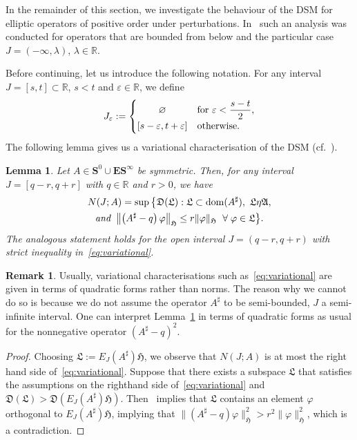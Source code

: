 \documentclass[10pt]{amsart}
\newtheorem{lemm}[theo]{Lemma}\newtheorem{prop}[theo]{Proposition}\newtheorem{coro}[theo]{Corollary}\newtheorem{conj}[theo]{Conjecture}
\theoremstyle{definition}\newtheorem{defi}[theo]{Definition}\newtheorem{rema}[theo]{Remark}\newtheorem{exam}[theo]{Example}\newtheorem{nota}[theo]{Notation}
\DeclareMathOperator{\dom}{dom}
\newcommand{\R}{\mathbb R}
\newcommand{\BE}{\mathbf E}
\newcommand{\BS}{\mathbf S}
\newcommand{\FA}{\mathfrak A}
\newcommand{\FD}{\mathfrak D}
\newcommand{\FH}{\mathfrak H}
\newcommand{\FL}{\mathfrak L}
\renewcommand{\phi}{\varphi}
\newcommand{\eps}{\varepsilon}
\let\oldforall\forall
\renewcommand*{\forall}{\mathrel{\oldforall}}
\begin{document}
In the remainder of this section, we investigate the behaviour of the DSM for elliptic operators of positive order under perturbations. In~\cite{MorParSht2014,ParSht2012,ParSht2016} such an analysis was conducted for operators that are bounded from below and the particular case $J = (-\infty,
\lambda)$, $\lambda\in\R$.

Before continuing, let us introduce the following notation. For any interval $J =[s,t]\subset \R$, $s <t$ and $\eps \in\R$, we define
\[
J_{\eps}:=
\begin{cases}
\hfill\varnothing\hfill & \text{for } \eps < \dfrac{s-t}{2}, \\
[s-\eps, t+\eps] & \text{otherwise}.
\end{cases}
\]
The following lemma gives us a variational characterisation of the DSM (cf.~\cite[Lemma~4.1]{ParSht2012}).

\begin{lemm}\label{lem:variational}
Let $A\in \BS^0\cup\BE\BS^\infty$ be symmetric. Then, for any interval $J=[q-r,q+r]$ with $q\in\R$ and $r>0$, we have
\begin{multline}\label{eq:variational}
N(J;A) = \sup\big\{\FD(\FL) : \FL\subset\dom(A^\sharp),\ \FL \eta \FA,
\\\text{\emph{and} }
\left\|\left(A^\sharp-q\right)\phi\right\|_{\FH}\leq r\|\phi\|_\FH \ \forall \phi
\in \FL\big\}.
\end{multline}
The analogous statement holds for the open interval $J=(q-r,q+r)$ with strict inequality in~\eqref{eq:variational}.
\end{lemm}

\begin{rema}
Usually, variational characterisations such as~\eqref{eq:variational} are given in terms of quadratic forms rather than norms. The reason why we cannot do so is because we do not assume the operator $A^\sharp$ to be semi-bounded, $J$ a semi-infinite interval. One can interpret Lemma~\ref{lem:variational} in terms of quadratic forms as usual for the nonnegative operator $(A^\sharp - q)^2$.
\end{rema}

\begin{proof}
Choosing $\FL := E_J(A^\sharp) \FH$, we observe that $N(J;A)$ is at most the right hand side of~\eqref{eq:variational}. Suppose that there exists a subspace $\FL$ that satisfies the assumptions on the righthand side of~\eqref{eq:variational} and $\FD(\FL) > \FD(E_J(A^\sharp)\FH)$. Then~\cite[\S 37.1, Lemma]{Naimark} implies that $\FL$ contains an element $\phi$ orthogonal to $E_J(A^\sharp)\FH$, implying that $\|(A^\sharp-q)\phi\|_{\FH}^2>r^2\|\phi\|_{\FH}^2$, which is a contradiction.
\end{proof}
\end{document}
